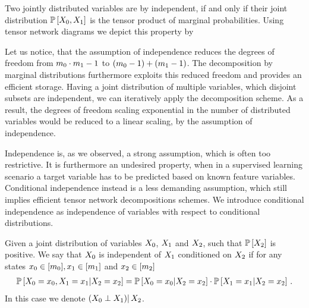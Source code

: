 Two jointly distributed variables are by  independent, if and only if their joint distribution $\mathbb{P}\left[X_{0},X_{1}\right]$ is the tensor product of marginal probabilities.
Using tensor network diagrams we depict this property by
\begin{center}
    
\end{center}
Let us notice, that the assumption of independence reduces the degrees of freedom from $m_{0}\cdot m_{1}-1$ to $(m_{0}-1)+(m_{1}-1)$.
The decomposition by marginal distributions furthermore exploits this reduced freedom and provides an efficient storage.
Having a joint distribution of multiple variables, which disjoint subsets are independent, we can iteratively apply the decomposition scheme.
As a result, the degrees of freedom scaling exponential in the number of distributed variables would be reduced to a linear scaling, by the assumption of independence.

Independence is, as we observed, a strong assumption, which is often too restrictive.
It is furthermore an undesired property, when in a supervised learning scenario a target variable has to be predicted based on known feature variables.
Conditional independence instead is a less demanding assumption, which still implies efficient tensor network decompositions schemes.
We introduce conditional independence as independence of variables with respect to conditional distributions.

\begin{definition}
    \label{def:condIndependence}
    Given a joint distribution of variables $X_{0}$, $X_{1}$ and $X_{2}$, such that $\mathbb{P}\left[X_{2}\right]$ is positive.
    We say that $X_{0}$ is independent of $X_{1}$ conditioned on $X_{2}$ if for any states $x_{0}\in[m_{0}],x_{1}\in[m_{1}]$ and $x_{2}\in[m_{2}]$
    \begin{align*}
        \mathbb{P}\left[X_{0}=x_{0},X_{1}=x_{1}|X_{2}=x_{2}\right]
        = \mathbb{P}\left[X_{0}=x_{0}|X_{2}=x_{2}\right]
        \cdot \mathbb{P}\left[X_{1}=x_{1}|X_{2}=x_{2}\right]   \, .
    \end{align*}
    In this case we denote $\left(X_{0}\perp X_{1}\middle)\right| X_{2}$.
\end{definition}

